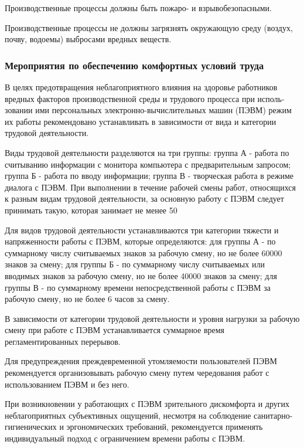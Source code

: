 Производственные процессы должны быть пожаро- и взрывобезопасными.

Производственные процессы не должны загрязнять окружающую среду (воздух, почву, водоемы) выбросами вредных веществ.

\subsubsection{Мероприятия по обеспечению комфортных условий труда}

В целях предотвращения неблагоприятного влияния на здоровье работников вредных факторов производственной среды и трудового процесса при исполь-зовании ими персональных электронно-вычислительных машин (ПЭВМ) режим их работы рекомендовано устанавливать в зависимости от вида и категории трудовой деятельности.

Виды трудовой деятельности разделяются на три группы: группа А - работа по считыванию информации с монитора компьютера с предварительным запросом; группа Б - работа по вводу информации; группа В - творческая работа в режиме диалога с ПЭВМ. При выполнении в течение рабочей смены работ, относящихся к разным видам трудовой деятельности, за основную работу с ПЭВМ следует принимать такую, которая занимает не менее 50%

Для видов трудовой деятельности устанавливаются три категории тяжести и напряженности работы с ПЭВМ, которые определяются: для группы А - по суммарному числу считываемых знаков за рабочую смену, но не более 60000 знаков за смену; для группы Б - по суммарному числу считываемых или вводимых знаков за рабочую смену, но не более 40000 знаков за смену; для группы В - по суммарному времени непосредственной работы с ПЭВМ за рабочую смену, но не более 6 часов за смену.

В зависимости от категории трудовой деятельности и уровня нагрузки за рабочую смену при работе с ПЭВМ устанавливается суммарное время регламентированных перерывов.

Для предупреждения преждевременной утомляемости пользователей ПЭВМ рекомендуется организовывать рабочую смену путем чередования работ с использованием ПЭВМ и без него.

При возникновении у работающих с ПЭВМ зрительного дискомфорта и других неблагоприятных субъективных ощущений, несмотря на соблюдение санитарно-гигиенических и эргономических требований, рекомендуется применять индивидуальный подход с ограничением времени работы с ПЭВМ.


